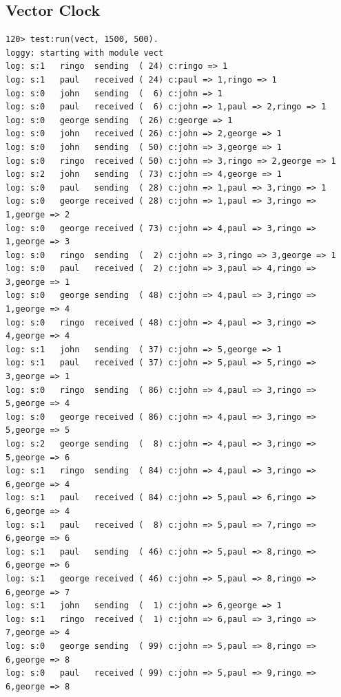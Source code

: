 \documentclass[a4paper, 11pt]{article}
\begin{document}
\subsection{Vector Clock}
\begin{verbatim}
120> test:run(vect, 1500, 500).
loggy: starting with module vect
log: s:1   ringo  sending  ( 24) c:ringo => 1
log: s:1   paul   received ( 24) c:paul => 1,ringo => 1
log: s:0   john   sending  (  6) c:john => 1
log: s:0   paul   received (  6) c:john => 1,paul => 2,ringo => 1
log: s:0   george sending  ( 26) c:george => 1
log: s:0   john   received ( 26) c:john => 2,george => 1
log: s:0   john   sending  ( 50) c:john => 3,george => 1
log: s:0   ringo  received ( 50) c:john => 3,ringo => 2,george => 1
log: s:2   john   sending  ( 73) c:john => 4,george => 1
log: s:0   paul   sending  ( 28) c:john => 1,paul => 3,ringo => 1
log: s:0   george received ( 28) c:john => 1,paul => 3,ringo => 1,george => 2
log: s:0   george received ( 73) c:john => 4,paul => 3,ringo => 1,george => 3
log: s:0   ringo  sending  (  2) c:john => 3,ringo => 3,george => 1
log: s:0   paul   received (  2) c:john => 3,paul => 4,ringo => 3,george => 1
log: s:0   george sending  ( 48) c:john => 4,paul => 3,ringo => 1,george => 4
log: s:0   ringo  received ( 48) c:john => 4,paul => 3,ringo => 4,george => 4
log: s:1   john   sending  ( 37) c:john => 5,george => 1
log: s:1   paul   received ( 37) c:john => 5,paul => 5,ringo => 3,george => 1
log: s:0   ringo  sending  ( 86) c:john => 4,paul => 3,ringo => 5,george => 4
log: s:0   george received ( 86) c:john => 4,paul => 3,ringo => 5,george => 5
log: s:2   george sending  (  8) c:john => 4,paul => 3,ringo => 5,george => 6
log: s:1   ringo  sending  ( 84) c:john => 4,paul => 3,ringo => 6,george => 4
log: s:1   paul   received ( 84) c:john => 5,paul => 6,ringo => 6,george => 4
log: s:1   paul   received (  8) c:john => 5,paul => 7,ringo => 6,george => 6
log: s:1   paul   sending  ( 46) c:john => 5,paul => 8,ringo => 6,george => 6
log: s:1   george received ( 46) c:john => 5,paul => 8,ringo => 6,george => 7
log: s:1   john   sending  (  1) c:john => 6,george => 1
log: s:1   ringo  received (  1) c:john => 6,paul => 3,ringo => 7,george => 4
log: s:0   george sending  ( 99) c:john => 5,paul => 8,ringo => 6,george => 8
log: s:0   paul   received ( 99) c:john => 5,paul => 9,ringo => 6,george => 8
\end{verbatim}
\end{document}
